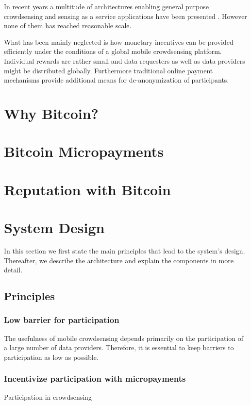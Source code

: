 In recent years a multitude of architectures enabling general purpose crowdsensing and sensing as a service applications have been presented \cite{6558754,6525603,giannotti2012planetary,Haderer2015,merlino2016mobile}. However none of them has reached reasonable scale.

What has been mainly neglected is how monetary incentives can be provided efficiently under the conditions of a global mobile crowdsensing platform. 
Individual rewards are rather small and data requesters as well as data providers might be distributed globally. Furthermore traditional online payment mechanisms provide additional means for de-anonymization of participants. 

\section{Why Bitcoin?}


\section{Bitcoin Micropayments}


\section{Reputation with Bitcoin}


\section{System Design}

In this section we first state the main principles that lead to the system's design. Thereafter, we describe the architecture and explain the components in more detail.

\subsection{Principles}
\label{sec:principles}

\subsubsection{Low barrier for participation}
The usefulness of mobile crowdsensing depends primarily on the participation of a large number of data providers. Therefore, it is essential to keep barriers to participation as low as possible.

\subsubsection{Incentivize participation with micropayments}
Participation in crowdsensing 

